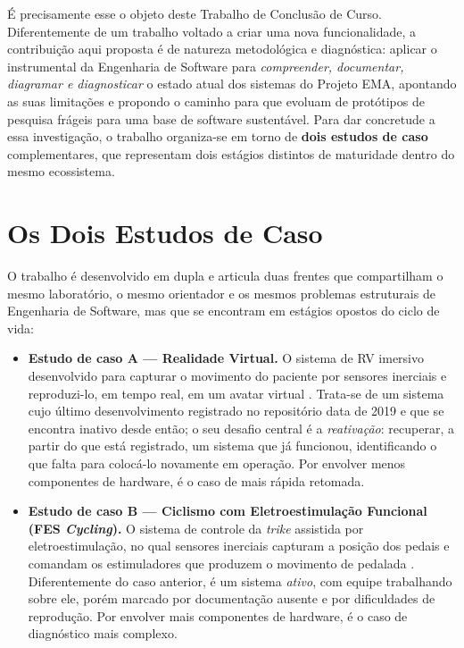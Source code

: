 É precisamente esse o objeto deste Trabalho de Conclusão de Curso. Diferentemente de um
trabalho voltado a criar uma nova funcionalidade, a contribuição aqui proposta é de
natureza metodológica e diagnóstica: aplicar o instrumental da Engenharia de Software para
\emph{compreender, documentar, diagramar e diagnosticar} o estado atual dos sistemas do
Projeto EMA, apontando as suas limitações e propondo o caminho para que evoluam de
protótipos de pesquisa frágeis para uma base de software sustentável. Para dar concretude a
essa investigação, o trabalho organiza-se em torno de \textbf{dois estudos de caso}
complementares, que representam dois estágios distintos de maturidade dentro do mesmo
ecossistema.

\section{Os Dois Estudos de Caso}
\label{sec:estudos-de-caso}

O trabalho é desenvolvido em dupla e articula duas frentes que compartilham o mesmo
laboratório, o mesmo orientador e os mesmos problemas estruturais de Engenharia de
Software, mas que se encontram em estágios opostos do ciclo de vida:

\begin{itemize}
	\item \textbf{Estudo de caso A --- Realidade Virtual.} O sistema de RV imersivo
	      desenvolvido para capturar o movimento do paciente por sensores inerciais e
	      reproduzi-lo, em tempo real, em um avatar virtual \cite{balbino2020}. Trata-se de
	      um sistema cujo último desenvolvimento registrado no repositório data de 2019 e que
	      se encontra inativo desde então; o seu desafio central é a \emph{reativação}:
	      recuperar, a partir do que está registrado, um sistema que já funcionou,
	      identificando o que falta para colocá-lo novamente em operação. Por envolver menos
	      componentes de hardware, é o caso de mais rápida retomada.
	\item \textbf{Estudo de caso B --- Ciclismo com Eletroestimulação Funcional (FES
	      \emph{Cycling}).} O sistema de controle da \emph{trike} assistida por
	      eletroestimulação, no qual sensores inerciais capturam a posição dos pedais e
	      comandam os estimuladores que produzem o movimento de pedalada
	      \cite{brindeiro2017,baptista2022}. Diferentemente do caso anterior, é um sistema
	      \emph{ativo}, com equipe trabalhando sobre ele, porém marcado por documentação
	      ausente e por dificuldades de reprodução. Por envolver mais componentes de
	      hardware, é o caso de diagnóstico mais complexo.
\end{itemize}

